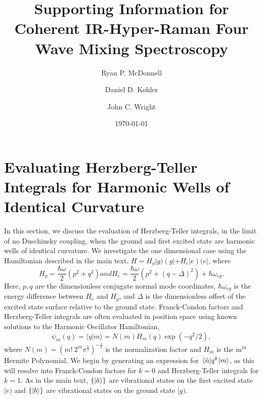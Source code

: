 \documentclass[aip, jcp, reprint, onecolumn, nofootinbib]{revtex4-2}
\begin{document}
\title{Supporting Information for Coherent IR-Hyper-Raman Four Wave Mixing Spectroscopy}


\author{Ryan P. McDonnell} 
\author{Daniel D. Kohler}
\author{John C. Wright} 


\date{\today}

\maketitle
\tableofcontents
\clearpage


\section{Evaluating Herzberg-Teller Integrals for Harmonic Wells of Identical Curvature}
In this section, we discuss the evaluation of Herzberg-Teller integrals, in the limit of no Duschinsky coupling, when the ground and first excited state are harmonic wells of identical curvature.\cite{HerzbergTeller1933, Duschinsky1937}
We investigate the one dimensional case using the Hamiltonian described in the main text, $H = H_g |g) \left(g| + H_e |e\right) (e|$, where
\begin{subequations}\label{Hamiltonian}
	\begin{equation}
		H_g = \frac{\hbar \omega }{2} \left(p^2 + q^2 \right)
	\end{equation}
	and
	\begin{equation}
		H_e = \frac{\hbar \omega }{2} \left(p^2 +  (q-\Delta)^2 \right) + \hbar \omega_{eg}.
	\end{equation} 
\end{subequations}
Here, $p,q$ are the dimensionless conjugate normal mode coordinates, $\hbar\omega_{eg}$ is the energy difference between $H_e$ and $H_g$, and $\Delta$ is the dimensionless offset of the excited state surface relative to the ground state.
Franck-Condon factors and Herzberg-Teller integrals are often evaluated in position space using known solutions to the Harmonic Oscillator Hamiltonian, 
\begin{equation}
	\psi_m(q) = \langle q | m \rangle = N(m) H_m(q) \exp(-q^2/2),
\end{equation}
where $N(m) = (m! \ 2^m \pi^{\frac{1}{2}})^{-\frac{1}{2}}$ is the normalization factor and $H_m$ is the m$^{th}$ Hermite Polynomial.\cite{RN230}
We begin by generating an expression for $\mel{\tilde{n}}{q^k}{m}$, as this will resolve into Franck-Condon factors for $k = 0$ and Herzberg-Teller integrals for $k=1$.
As in the main text, $\{\ket{\tilde{a}}\}$ are vibrational states on the first excited state $|e)$ and $\{\ket{b}\}$ are vibrational states on the ground state $|g)$.
\end{document}
